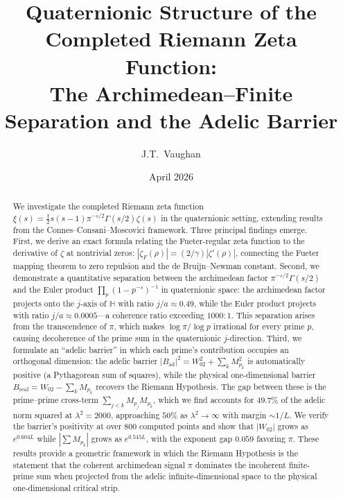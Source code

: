 \documentclass[11pt,a4paper]{article}
\title{Quaternionic Structure of the Completed Riemann Zeta Function:\\
The Archimedean--Finite Separation and the Adelic Barrier}
\author{J.T.\ Vaughan}
\date{April 2026}
\theoremstyle{definition}
\begin{document}
\maketitle

\begin{abstract}
We investigate the completed Riemann zeta function $\xi(s) = \frac{1}{2}s(s-1)\pi^{-s/2}\Gamma(s/2)\zeta(s)$ in the quaternionic setting, extending results from the Connes--Consani--Moscovici framework. Three principal findings emerge. First, we derive an exact formula relating the Fueter-regular zeta function to the derivative of $\zeta$ at nontrivial zeros: $|\zeta_F(\rho)| = (2/\gamma)|\zeta'(\rho)|$, connecting the Fueter mapping theorem to zero repulsion and the de Bruijn--Newman constant. Second, we demonstrate a quantitative separation between the archimedean factor $\pi^{-s/2}\Gamma(s/2)$ and the Euler product $\prod_p(1-p^{-s})^{-1}$ in quaternionic space: the archimedean factor projects onto the $j$-axis of $\mathbb{H}$ with ratio $j/a \approx 0.49$, while the Euler product projects with ratio $j/a \approx 0.0005$---a coherence ratio exceeding $1000{:}1$. This separation arises from the transcendence of $\pi$, which makes $\log\pi/\log p$ irrational for every prime $p$, causing decoherence of the prime sum in the quaternionic $j$-direction. Third, we formulate an ``adelic barrier'' in which each prime's contribution occupies an orthogonal dimension: the adelic barrier $|B_{\mathrm{ad}}|^2 = W_{02}^2 + \sum_k M_{p_k}^2$ is automatically positive (a Pythagorean sum of squares), while the physical one-dimensional barrier $B_{\mathrm{real}} = W_{02} - \sum_k M_{p_k}$ recovers the Riemann Hypothesis. The gap between these is the prime--prime cross-term $\sum_{j<k} M_{p_j} M_{p_k}$, which we find accounts for $49.7\%$ of the adelic norm squared at $\lambda^2 = 2000$, approaching $50\%$ as $\lambda^2 \to \infty$ with margin $\sim 1/L$. We verify the barrier's positivity at over 800 computed points and show that $|W_{02}|$ grows as $e^{0.604 L}$ while $|\sum M_{p_k}|$ grows as $e^{0.545 L}$, with the exponent gap $0.059$ favoring $\pi$. These results provide a geometric framework in which the Riemann Hypothesis is the statement that the coherent archimedean signal $\pi$ dominates the incoherent finite-prime sum when projected from the adelic infinite-dimensional space to the physical one-dimensional critical strip.
\end{abstract}

\tableofcontents

\end{document}
